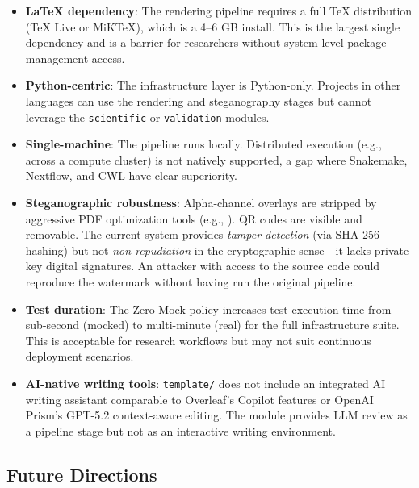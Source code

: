 \documentclass[
]{article}
\providecommand{\tightlist}{%
  \setlength{\itemsep}{0pt}\setlength{\parskip}{0pt}}
\begin{document}
\begin{itemize}
\tightlist
\item
  \textbf{LaTeX dependency}: The rendering pipeline requires a full TeX
  distribution (TeX Live or MiKTeX), which is a 4--6 GB install. This is
  the largest single dependency and is a barrier for researchers without
  system-level package management access.
\item
  \textbf{Python-centric}: The infrastructure layer is Python-only.
  Projects in other languages can use the rendering and steganography
  stages but cannot leverage the \texttt{scientific} or
  \texttt{validation} modules.
\item
  \textbf{Single-machine}: The pipeline runs locally. Distributed
  execution (e.g., across a compute cluster) is not natively supported,
  a gap where Snakemake, Nextflow, and CWL have clear superiority.
\item
  \textbf{Steganographic robustness}: Alpha-channel overlays are
  stripped by aggressive PDF optimization tools (e.g.,
  ). QR codes are visible and removable. The
  current system provides \emph{tamper detection} (via SHA-256 hashing)
  but not \emph{non-repudiation} in the cryptographic sense---it lacks
  private-key digital signatures. An attacker with access to the source
  code could reproduce the watermark without having run the original
  pipeline.
\item
  \textbf{Test duration}: The Zero-Mock policy increases test execution
  time from sub-second (mocked) to multi-minute (real) for the full
  infrastructure suite. This is acceptable for research workflows but
  may not suit continuous deployment scenarios.
\item
  \textbf{AI-native writing tools}: \texttt{template/} does not include
  an integrated AI writing assistant comparable to Overleaf's Copilot
  features or OpenAI Prism's GPT-5.2 context-aware editing. The
   module provides LLM review as a pipeline
  stage but not as an interactive writing environment.
\end{itemize}

\newpage

\subsection{Future Directions}\label{future-directions}
\end{document}
